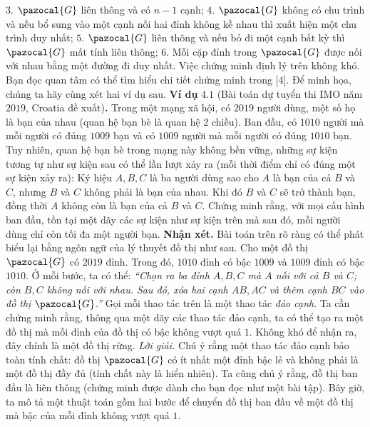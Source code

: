 \begin{multicols}{2}
	\vskip 0.1cm
	$3.$ $\pazocal{G}$ liên thông và có $n-1$ cạnh;
	\vskip 0.1cm
	$4.$ $\pazocal{G}$ không có chu trình và nếu bổ sung vào một cạnh nối hai đỉnh không kề nhau thì xuất hiện một chu trình duy nhất;
	\vskip 0.1cm
	$5.$ $\pazocal{G}$ liên thông và nếu bỏ đi một cạnh bất kỳ thì $\pazocal{G}$ mất tính liên thông;
	\vskip 0.1cm
	$6.$ Mỗi cặp đỉnh trong $\pazocal{G}$ được nối với nhau bằng một đường đi duy nhất.
	\vskip 0.1cm
	Việc chứng minh định lý trên không khó. Bạn đọc quan tâm có thể tìm hiểu chi tiết chứng minh trong [$4$]. Để minh họa, chúng ta hãy cùng xét hai ví dụ sau.
	\vskip 0.1cm
	\textbf{\color{hoccungpi}Ví dụ} $\pmb{4.1}$ (Bài toán dự tuyển thi IMO  năm $2019$, Croatia đề xuất)\textbf{\color{hoccungpi}.}
	Trong một mạng xã hội, có $2019$ người dùng, một số họ là bạn của nhau (quan hệ bạn bè là quan hệ $2$ chiều). Ban đầu, có $1010$ người mà mỗi người có đúng $1009$ bạn và có $1009$ người mà mỗi người có đúng $1010$ bạn. Tuy nhiên, quan hệ bạn bè trong mạng này không bền vững, những sự kiện tương tự như sự kiện sau có thể lần lượt xảy ra (mỗi thời điểm chỉ có đúng một sự kiện xảy ra):
	\vskip 0.1cm
	Ký hiệu $A,B,C$ là ba người dùng sao cho $A$ là bạn của cả $B$ và $C$, nhưng $B$ và $C$ không phải là bạn của nhau. Khi đó $B$ và $C$ sẽ trở thành bạn, đồng thời $A$ không còn là bạn của cả $B$ và $C$.
	\vskip 0.1cm
	Chứng minh rằng, với mọi cấu hình ban đầu, tồn tại một dãy các sự kiện như sự kiện trên mà sau đó, mỗi người dùng chỉ còn tối đa một người bạn.  
	\vskip 0.1cm
	\textbf{\color{hoccungpi}Nhận xét. } Bài toán trên rõ ràng có thể phát biểu lại bằng ngôn ngữ của lý thuyết đồ thị như sau. Cho một đồ thị $\pazocal{G}$ có $2019$ đỉnh. Trong đó, $1010$ đỉnh có bậc $1009$ và $1009$ đỉnh có bậc $1010$. Ở mỗi bước, ta có thể: \textit{``Chọn ra ba đỉnh $A,B,C$ mà $A$ nối với cả $B$ và $C$; còn $B,C$ không nối với nhau. Sau đó, xóa hai cạnh $AB,AC$ và thêm cạnh $BC$ vào đồ thị $\pazocal{G}$.''}
	\vskip 0.1cm
	Gọi mỗi thao tác trên là một thao tác \textit{đảo cạnh}. Ta cần chứng minh rằng, thông qua một dãy các thao tác đảo cạnh, ta có thể tạo ra một đồ thị mà mỗi đỉnh của đồ thị có bậc không vượt quá $1$. Không khó để nhận ra, đây chính là một đồ thị rừng. 
	\vskip 0.1cm
	\textit{Lời giải.}
	Chú ý rằng một thao tác đảo cạnh bảo toàn tính chất: đồ thị $\pazocal{G}$ có ít nhất một đỉnh bậc lẻ và không phải là một đồ thị đầy đủ (tính chất này là hiển nhiên). Ta cũng chú ý rằng, đồ thị ban đầu là liên thông (chứng minh được dành cho bạn đọc như một bài tập). Bây giờ, ta mô tả một thuật toán gồm hai bước để chuyển đồ thị ban đầu về một đồ thị mà bậc của mỗi đỉnh không vượt quá $1$. 

\end{multicols}

